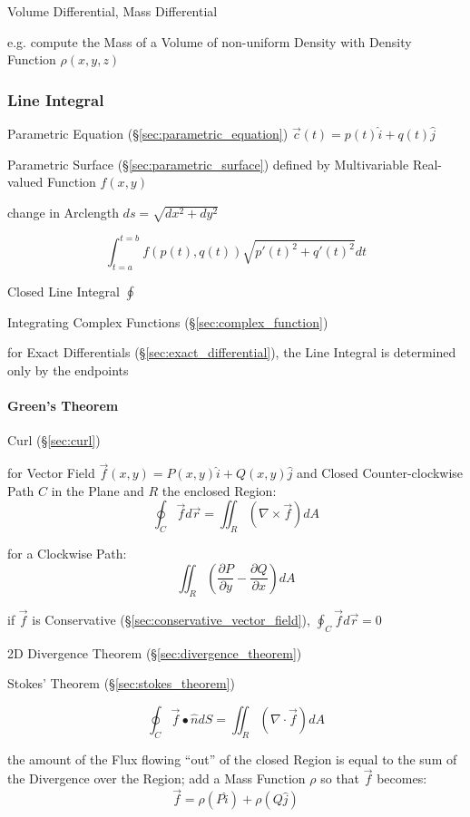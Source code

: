 {Volume Differential, Mass Differential

e.g. compute the Mass of a Volume of non-uniform Density with Density Function
$\rho(x,y,z)$



\subsubsection{Line Integral}\label{sec:line_integral}

Parametric Equation (\S\ref{sec:parametric_equation}) $\vec{c}(t) = p(t)\hat{i}
+ q(t)\hat{j}$

Parametric Surface (\S\ref{sec:parametric_surface}) defined by Multivariable
Real-valued Function $f(x,y)$

change in Arclength $ds = \sqrt{dx^2 + dy^2}$

\[
  \int_{t=a}^{t=b} f(p(t),q(t)) \sqrt{p'(t)^2 + q'(t)^2} dt
\]

Closed Line Integral $\oint$

Integrating Complex Functions (\S\ref{sec:complex_function})

for Exact Differentials (\S\ref{sec:exact_differential}), the Line Integral is
determined only by the endpoints



\paragraph{Green's Theorem}\label{sec:greens_theorem}\hfill

Curl (\S\ref{sec:curl})

for Vector Field $\vec{f}(x,y) = P(x,y)\hat{i} + Q(x,y)\hat{j}$ and Closed
Counter-clockwise Path $C$ in the Plane and $R$ the enclosed Region:
\[
  \oint_C \vec{f} d\vec{r} = \iint_R (\nabla \times \vec{f}) dA
\]

for a Clockwise Path:
\[
  \iint_R (\frac{\partial{P}}{\partial{y}} - \frac{\partial{Q}}{\partial{x}}) dA
\]

if $\vec{f}$ is Conservative (\S\ref{sec:conservative_vector_field}), $\oint_C
\vec{f} d\vec{r} = 0$

\fist 2D Divergence Theorem (\S\ref{sec:divergence_theorem})

\fist Stokes' Theorem (\S\ref{sec:stokes_theorem})

\[
  \oint_C \vec{f} \bullet \hat{n} dS = \iint_R (\nabla \cdot \vec{f}) dA
\]

the amount of the Flux flowing ``out'' of the closed Region is equal to the sum
of the Divergence over the Region; add a Mass Function $\rho$ so that $\vec{f}$
becomes:
\[
  \vec{f} = \rho(P\hat{i}) + \rho(Q\hat{j})
\]



}
